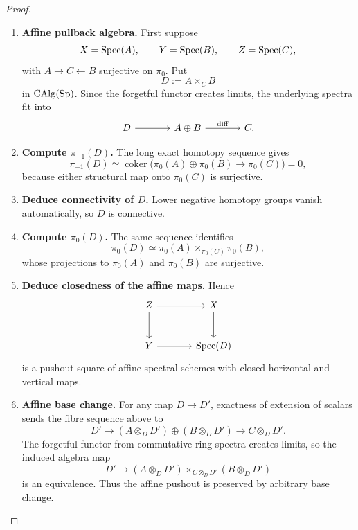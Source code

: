 \begin{proof}
\leavevmode
\begin{enumerate}[label=\textup{(\arabic*)}]
    \item \textbf{Affine pullback algebra.}
    First suppose
    \[
        X=\operatorname{Spec}(A),
        \qquad
        Y=\operatorname{Spec}(B),
        \qquad
        Z=\operatorname{Spec}(C),
    \]
    with \(A\to C\leftarrow B\) surjective on \(\pi_0\). Put
    \[
        D:=A\times_CB
    \]
    in \(\operatorname{CAlg}(\operatorname{Sp})\). Since the forgetful functor creates limits, the
    underlying spectra fit into
    \[
    \begin{tikzcd}[column sep=large]
        D
            \arrow[r]
        &
        A\oplus B
            \arrow[r, "{\mathrm{diff}}"]
        &
        C.
    \end{tikzcd}
    \]

    \item \textbf{Compute \(\pi_{-1}(D)\).}
    The long exact homotopy sequence gives
    \[
        \pi_{-1}(D)
        \simeq
        \operatorname{coker}
        \bigl(\pi_0(A)\oplus\pi_0(B)\to\pi_0(C)\bigr)=0,
    \]
    because either structural map onto \(\pi_0(C)\) is surjective.

    \item \textbf{Deduce connectivity of \(D\).}
    Lower
    negative homotopy groups vanish automatically, so \(D\) is connective.

    \item \textbf{Compute \(\pi_0(D)\).}
    The same sequence identifies
    \[
        \pi_0(D)
        \simeq
        \pi_0(A)\times_{\pi_0(C)}\pi_0(B),
    \]
    whose projections to \(\pi_0(A)\) and \(\pi_0(B)\) are surjective.

    \item \textbf{Deduce closedness of the affine maps.}
    Hence
    \[
    \begin{tikzcd}[column sep=large, row sep=large]
        Z \arrow[r] \arrow[d]
            & X \arrow[d]
        \\
        Y \arrow[r]
            & \Spec(D)
    \end{tikzcd}
    \]
    is a pushout square of affine spectral schemes with closed horizontal and
    vertical maps.

    \item \textbf{Affine base change.}
    For any map \(D\to D'\), exactness of extension of scalars sends the
    fibre sequence above to
    \[
        D'
        \longrightarrow
        (A\otimes_DD')\oplus(B\otimes_DD')
        \longrightarrow
        C\otimes_DD'.
    \]
    The forgetful functor from commutative ring spectra creates limits, so the
    induced algebra map
    \[
        D'
        \longrightarrow
        (A\otimes_DD')
        \times_{C\otimes_DD'}
        (B\otimes_DD')
    \]
    is an equivalence. Thus the affine pushout is preserved by arbitrary base
    change.


\end{enumerate}
\end{proof}
